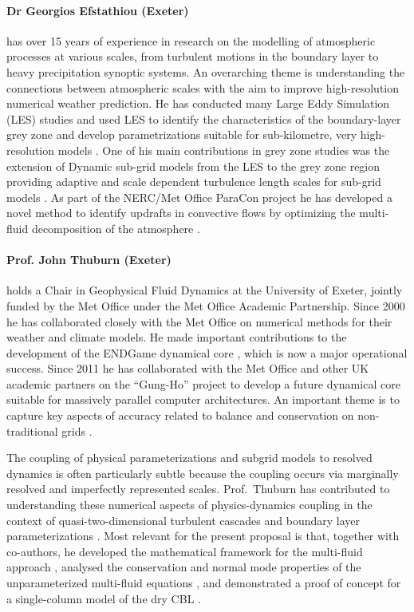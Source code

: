 \documentclass[11pt,a4paper]{article}
\begin{document}
\paragraph*{Dr Georgios Efstathiou (Exeter)} has over 15 years of experience in research on the modelling of
atmospheric processes at various scales, from turbulent motions in the boundary layer
to heavy precipitation synoptic systems. An overarching theme is understanding the
connections between atmospheric scales with the aim to improve high-resolution
numerical weather prediction. He has conducted many Large Eddy Simulation (LES) studies and used LES to identify 
the characteristics of the boundary-layer grey zone \citep[e.g.][]{efstathiou2015}
and develop parametrizations suitable for sub-kilometre, very high-resolution models 
\citep{efstathiou2016}. One of his main contributions in grey zone 
studies was the extension of Dynamic sub-grid models from the LES to the grey zone region 
providing adaptive and scale dependent turbulence length scales for sub-grid models 
\citep{efstathiou2018,efstathiou2019a}. As part of the NERC/Met Office ParaCon 
project he has developed a novel method to identify updrafts in convective flows 
by optimizing the multi-fluid decomposition of the atmosphere \citep{efstathiou2019b}.

\paragraph*{Prof. John Thuburn (Exeter)} holds a Chair in Geophysical Fluid Dynamics at the University of Exeter, jointly
funded by the Met Office under the Met Office Academic Partnership.
Since 2000 he has collaborated closely with the Met Office on numerical methods for their
weather and climate models. He made important contributions to the development of the
ENDGame dynamical core \cite[e.g.][]{WSW+14}, which is now a major operational success.
Since 2011 he has collaborated with the Met Office and other UK academic partners on the ``Gung-Ho''
project to develop a future dynamical core suitable for massively parallel computer
architectures. An important theme is to capture key aspects of accuracy related to balance and
conservation on non-traditional grids \cite[e.g.][]{TC15}.

The coupling of physical parameterizations and subgrid models to resolved dynamics is often
particularly subtle because the coupling occurs via marginally resolved and imperfectly
represented scales. Prof.\ Thuburn has contributed to understanding these numerical aspects
of physics-dynamics coupling in the context of quasi-two-dimensional turbulent cascades \cite[e.g.][]{TKW14} and boundary layer parameterizations \cite[]{HTW13a}.
Most relevant for the present proposal is that,
together with co-authors, he developed the mathematical framework for the multi-fluid
approach \citep[][]{TWV+18}, analysed the conservation and normal mode properties
of the unparameterized multi-fluid equations \citep[][]{TV18}, and demonstrated
a proof of concept for a single-column model of the dry CBL \citep[][]{TEB19}.
\end{document}

